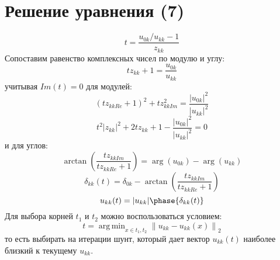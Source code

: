 \documentclass[lettersize,journal]{IEEEtran}
\DeclareMathOperator*{\argmin}{arg\,min} %
\newcommand\norm[1]{\left\lVert#1\right\rVert}
\begin{document}
\section{Решение уравнения (7)}
\begin{equation}
	t=\frac{u_{0k}/u_{kk} -1}{z_{kk}}
\end{equation}
Сопоставим равенство комплексных чисел по модулю и углу:
\begin{equation}
 	tz_{kk} + 1 = \frac{u_{0k}}{u_{kk}}
 \end{equation} 
учитывая \(Im(t) = 0\) для модулей:
\begin{equation}
 	(tz_{kkRe} + 1)^2 + tz_{kkIm}^2= \frac{|u_{0k}|^2}{|u_{kk}|^2}
\end{equation} 
\begin{equation}
	\label{eqn_quad}
	t^2|z_{kk}|^2 + 2tz_{kk} + 1 -  \frac{|u_{0k}|^2}{|u_{kk}|^2} = 0
\end{equation} 
и для углов:
\begin{equation}
		\arctan \left(\frac{tz_{kkIm}}{tz_{kkRe} + 1}\right) = \arg(u_{0k}) - \arg(u_{kk})
\end{equation} 
\begin{equation}
	\delta_{kk}(t) = \delta_{0k} - \arctan \left(\frac{tz_{kkIm}}{tz_{kkRe} + 1}\right)
\end{equation} 
\begin{equation}
	u_{kk}(t)=|u_{kk}|\phase{\delta_{kk}(t)}
\end{equation} 
Для выбора корней \(t_1\) и \(t_2\) можно воспользоваться условием:
\begin{equation}
	t=\argmin_{x\in{t_1, t_2}}{\norm{u_{kk} - u_{kk}(x)}_2}
\end{equation}
то есть выбирать на итерации шунт,  который дает вектор \(u_{kk}(t)\) наиболее близкий к текущему \(u_{kk}\).
\end{document}
